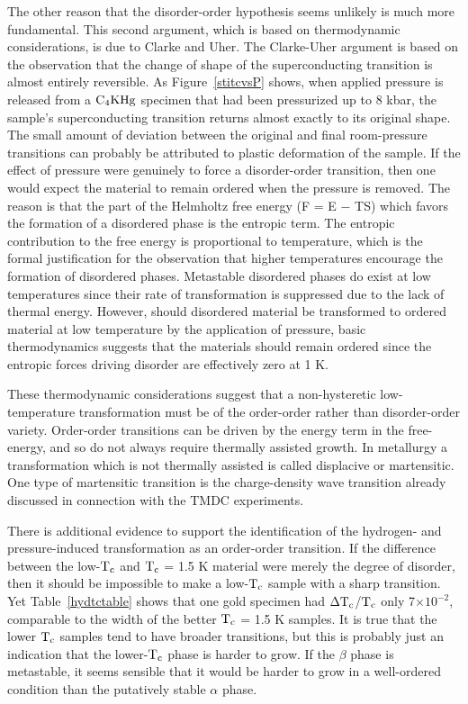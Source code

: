         The other reason that the disorder-order  hypothesis seems unlikely
is  much   more  fundamental.  This   second argument,   which is based  on
thermodynamic considerations, is due to Clarke and Uher.\cite{clarke84} The
Clarke-Uher argument is based on  the observation that  the change of shape
of the  superconducting  transition   is almost  entirely  reversible.   As
Figure~\ref{stitcvsP} shows, when applied pressure  is released from a $\rm
C_4KHg$  specimen that had  been  pressurized up to   8 kbar, the  sample's
superconducting transition returns  almost exactly to its  original  shape.
The small amount of deviation between  the original and final room-pressure
transitions can probably   be attributed to  plastic   deformation  of  the
sample.  If the effect of pressure were genuinely to force a disorder-order
transition, then one would expect  the material to remain ordered  when the
pressure is removed.   The reason is  that the  part of  the Helmholtz free
energy (F = E $-$ TS) which favors the formation of a  disordered phase is the
entropic term.   The  entropic   contribution  to   the   free  energy   is
proportional to temperature, which   is the  formal  justification  for the
observation that higher temperatures encourage the formation  of disordered
phases.   Metastable disordered phases do exist  at low  temperatures since
their  rate of transformation is  suppressed due  to   the lack  of thermal
energy.  However, should  disordered  material be transformed   to  ordered
material  at   low  temperature by  the   application  of  pressure,  basic
thermodynamics suggests that the materials should remain ordered  since the
entropic forces driving disorder are effectively zero at 1 K.  

        These   thermodynamic considerations suggest that a  non-hysteretic
low-temperature transformation   must be of   the  order-order rather  than
disorder-order variety.   Order-order  transitions  can be   driven by  the
energy term  in the free-energy,   and so do not always   require thermally
assisted  growth.  In metallurgy  a  transformation which is  not thermally
assisted is called displacive or martensitic.\cite{christian81} One type of
martensitic  transition  is  the  charge-density  wave  transition  already
discussed in connection with the TMDC experiments.\cite{fuller81}

        There is additional evidence  to support the  identification of the
hydrogen- and pressure-induced transformation as an order-order transition.
If the difference between the low-$\rm T_c$ and $\rm T_c$  = 1.5 K material
were merely the degree of disorder, then it should be  impossible to make a
low-$\rm T_c$ sample with  a sharp transition.  Yet  Table~\ref{hydtctable}
shows that one gold specimen had $\rm  \Delta  T_c$/$\rm T_c$ only 7$\times
10^{-2}$, comparable to the width of the better $\rm T_c$ = 1.5  K samples.
It   is true that   the  lower $\rm   T_c$  samples tend   to  have broader
transitions, but this is probably  just an indication that  the  lower-$\rm
T_c$ phase is harder to grow.  If the $\beta$ phase is metastable, it seems
sensible that it would be harder to  grow in a  well-ordered condition than
the putatively stable $\alpha$ phase.

